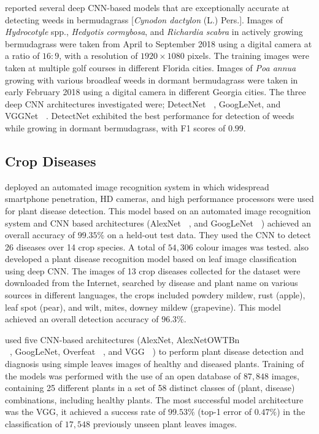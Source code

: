 \documentclass[12pt]{report}
\numberwithin{equation}{section}
\begin{document}
\textbf{\cite{yu2019deep}} reported several deep CNN-based models that are exceptionally accurate at detecting weeds in bermudagrass [\textit{Cynodon dactylon} (L.) Pers.]. Images of \textit{Hydrocotyle} spp., \textit{Hedyotis cormybosa}, and \textit{Richardia scabra} in actively growing bermudagrass were taken from April to September 2018 using a digital camera  at a ratio of $16:9$, with a resolution of $1920\times 1080$ pixels. The training images were taken at multiple golf courses in different Florida cities. Images of \textit{Poa annua} growing with various broadleaf weeds in dormant bermudagrass were taken in early February 2018 using a digital camera in different Georgia cities. The three deep CNN architectures investigated were; DetectNet \textbf{~\cite{tao2016detectnet}}, GoogLeNet, and VGGNet \textbf{~\cite{simonyan2014very}}. DetectNet exhibited the best performance for detection of weeds while growing in dormant bermudagrass, with F1 scores of $0.99$.


\subsection{Crop Diseases}
\textbf{\cite{prasanna2016using}} deployed an automated image recognition system in which widespread smartphone penetration, HD cameras, and high performance processors were used for plant disease detection. This model based on an automated image recognition system and CNN based architectures (AlexNet \textbf{~\cite{Krizhevsky}}, and GoogLeNet \textbf{~\cite{szegedy2015going}}) achieved an overall accuracy of $99.35\%$ on a held-out test data. They used the CNN to detect 26 diseases over 14 crop species. A total of $54,306$ colour images was tested. \textbf{\cite{sladojevic2016deep}} also developed a plant disease recognition model based on leaf image classification using deep CNN. The images of 13 crop diseases collected for the dataset were downloaded from the Internet, searched by disease and plant name on various sources in different languages, the crops included powdery mildew, rust (apple), leaf spot (pear), and wilt, mites, downey mildew (grapevine). This model achieved an overall detection accuracy of $96.3\%$.

\textbf{\cite{ferentinos2018deep}} used five CNN-based architectures (AlexNet, AlexNetOWTBn \\ \textbf{~\cite{krizhevsky2014one}}, GoogLeNet, Overfeat \textbf{~\cite{sermanet2013overfeat}}, and VGG \textbf{~\cite{simonyan2014very}}) to perform plant disease detection and diagnosis using simple leaves images of healthy and diseased plants. Training of the models was performed with the use of an open database of $87,848$ images, containing 25 different plants in a set of 58 distinct classes of (plant, disease) combinations, including healthy plants. The most successful model architecture was the VGG, it achieved a success rate of $99.53\%$ (top-1 error of $0.47\%$) in the classification of $17,548$ previously unseen plant leaves images.
\end{document}
